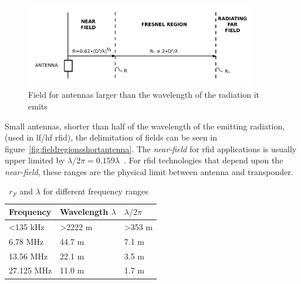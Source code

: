 \begin{figure}[!ht]
    \centering
    \includegraphics[width=0.9\textwidth]{./figs/02-state-of-the-art/FarNearFields-USP-4998112.pdf}
    \caption{Field for antennas larger than the wavelength of the radiation it emits~\cite{zerodamageFarFieldsVectorized1991}} 
    \label{fig:fieldregionsbigantenna}
\end{figure}

Small antennas, shorter than half of the wavelength of the emitting radiation, (used in \ac{lf}/\ac{hf} \ac{rfid}), the delimitation of fields can be seen in figure~\ref{fig:fieldregionsshortantenna}. The \emph{near-field} for \ac{rfid} applications is usually upper limited by $\lambda / 2\pi = 0.159\lambda$~\cite{nikitinOverviewFieldUHF2007a}. 
For \ac{rfid} technologies that depend upon the \emph{near-field}, these ranges are the physical limit between antenna and transponder.

\begin{table}[!htb]
    \centering
    \caption{$r_F$ and $\lambda$ for different frequency ranges~\cite{finkenzellerRFIDHandbookFundamentals2003}}
    \begin{tabular}{@{}lll@{}}
    \toprule
    \textbf{Frequency} & Wavelength $\lambda$ & $\lambda/2\pi$     \\ \midrule
    \textless 135 kHz  & \textgreater 2222 m  & \textgreater 353 m \\
    6.78 MHz           & 44.7 m               & 7.1 m              \\
    13.56 MHz          & 22.1 m               & 3.5 m              \\
    27.125 MHz         & 11.0 m               & 1.7 m              \\ \bottomrule
    \end{tabular}
    \label{tab:lambdafreqranges}
\end{table}

